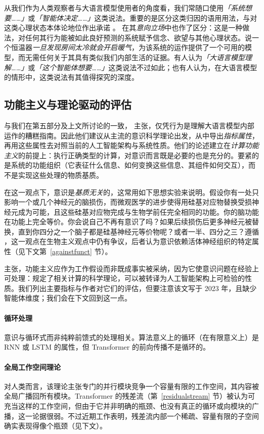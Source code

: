 从我们作为人类观察者与大语言模型使用者的角度看，我们常随口使用\emph{「系统想要……」}或\emph{「智能体决定……」}这类说法。重要的是区分这类归因的语用用法，与对这类心理状态本体论地位作出承诺 \citep{van-dijk-etal-2023-large}。\citet{dennett1987intentional} 在其\emph{意向立场}中也作了区分：这是一种做法，对任何其行为能被如此良好预测的系统赋予信念、欲望与其他心理状态。说一个恒温器\emph{一旦发现房间太冷就会开启暖气}，为该系统的运作提供了一个可用的模型，而无需任何关于其具有类似我们内部生活的证据。有人认为\emph{「大语言模型理解……」}或\emph{「这个智能体想要……」}这类说法不过如此；也有人认为，在大语言模型的情形中，这类说法有其值得探究的深度。

\subsection{功能主义与理论驱动的评估}
与我们在第五部分及上文所讨论的一致，\citet{butlin2023consciousness} 主张，仅凭行为是理解大语言模型内部运作的糟糕指南。因此他们建议从主流的意识科学理论出发，从中导出\emph{指标属性}，再用这些属性去对照当前的人工智能架构与系统性质。他们的论述建立在\emph{计算功能主义}的前提上：执行正确类型的计算，对意识而言既是必要的也是充分的。要紧的是系统的功能组织（它表征什么信息、如何变换这些信息、其组件如何交互），而不是实现这些处理的物质基质。

在这一观点下，意识是\emph{基质无关}的，这常用如下思想实验来说明。假设你有一处只影响一个或几个神经元的脑损伤，而微观医学的进步使得用硅基对应物替换受损神经元成为可能，且这些硅基对应物完成与生物学前任完全相同的功能。你的脑功能在功能上完全等价。你会说自己不再有意识了吗？如果后续损伤后更多神经元被替换，直到你四分之一个脑子都是硅基神经元等价物呢？或者一半、四分之三？遵循 \citet{searle1980minds}，这一观点在生物主义观点中仍有争议，后者认为意识依赖活体神经组织的特定属性（见下文第~\ref{againstfunct} 节）。

\citet{butlin2023consciousness} 主张，功能主义应作为工作假设而非既成事实被采纳，因为它使意识问题在经验上可处理：规定了相关计算的科学理论，可以被转译为人工智能架构上可检验的性质。我们列出主要指标与作者对它们的评估，但要注意该文写于 2023 年，且缺少智能体维度；我们会在下文回到这一点。

\paragraph{循环处理} 意识与循环式而非纯粹前馈式的处理相关。算法意义上的循环（在有限意义上）是 RNN 或 LSTM 的属性，但 Transformer 的前向传播不是循环的。

\paragraph{全局工作空间理论} 对人类而言，该理论主张专门的并行模块竞争一个容量有限的工作空间，其内容被全局广播回所有模块。Transformer 的残差流（第~\ref{residualstream} 节）被认为可充当这样的工作空间，但由于它并非明确的瓶颈、也没有真正的循环或向模块的广播，这一论据很弱。不过近期工作表明，残差流内部一个稀疏、容量有限的子空间确实表现得像个瓶颈（见下文）\citep{gurnee2026verbalize}。

